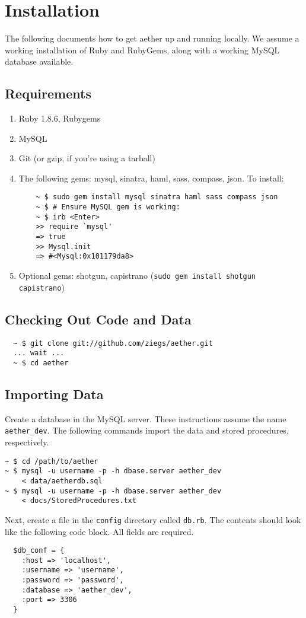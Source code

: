 \documentclass[12pt, letterpaper]{article}
\begin{document}
\section{Installation}
The following documents how to get aether up and running locally. We assume a working installation of Ruby and RubyGems, along with a working MySQL database available.

\subsection{Requirements}
\begin{enumerate}
  \item Ruby 1.8.6, Rubygems
  \item MySQL
  \item Git (or gzip, if you're using a tarball)
  \item The following gems: mysql, sinatra, haml, sass, compass, json. To install:
  \begin{verbatim}
    ~ $ sudo gem install mysql sinatra haml sass compass json
    ~ $ # Ensure MySQL gem is working:
    ~ $ irb <Enter>
    >> require `mysql'
    => true
    >> Mysql.init
    => #<Mysql:0x101179da8>
  \end{verbatim}
  \item Optional gems: shotgun, capistrano (\verb!sudo gem install shotgun capistrano!)
\end{enumerate}

\subsection{Checking Out Code and Data}
\begin{verbatim}
  ~ $ git clone git://github.com/ziegs/aether.git
  ... wait ...
  ~ $ cd aether
\end{verbatim}

\subsection{Importing Data}
Create a database in the MySQL server. These instructions assume the name \verb!aether_dev!. The following commands import the data and stored procedures, respectively.
\begin{verbatim}
~ $ cd /path/to/aether
~ $ mysql -u username -p -h dbase.server aether_dev 
    < data/aetherdb.sql
~ $ mysql -u username -p -h dbase.server aether_dev
    < docs/StoredProcedures.txt
\end{verbatim}
Next, create a file in the \verb!config! directory called \verb!db.rb!. The contents should look like the following code block. All fields are required.
\begin{verbatim}
  $db_conf = {
    :host => 'localhost',
    :username => 'username',
    :password => 'password',
    :database => 'aether_dev',
    :port => 3306
  }
\end{verbatim}
\end{document}
